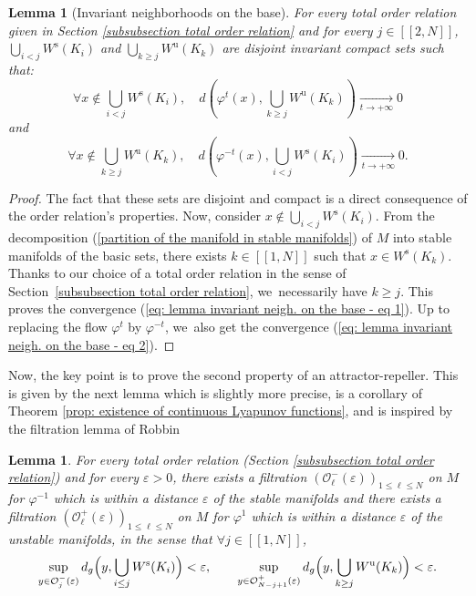 \documentclass[11pt]{article}
\newcommand{\lcr}{[\![}
\newcommand{\rcr}{]\!]}
\newcommand{\rs}{\mathrm{s}}
\newcommand{\ru}{\mathrm{u}}
\theoremstyle{definition}
\theoremstyle{plain}
\newtheorem{lemma}[definition]{Lemma}
\newcommand{\Ocal}{\mathcal{O}}
\begin{document}
\begin{lemma}[Invariant neighborhoods on the base]\label{lemma: attractor and repeller for the flow on the basis}
For every total order relation given in Section \ref{subsubsection total order relation} and for every $j\in\lcr2,N\rcr$, $\bigcup_{i < j}W^\rs (K_i)$ and $\bigcup_{k \geq j}W^\ru (K_k)$ are disjoint invariant compact sets such that:
\begin{equation}\label{eq: lemma invariant neigh. on the base - eq 1}
\forall x \notin \bigcup_{i < j}W^\rs (K_i), \quad d (\varphi^t (x), \bigcup_{k \geq j}W^\ru (K_k)) \underset{t \to+\infty}{\to} 0
\end{equation}
and
\begin{equation}\label{eq: lemma invariant neigh. on the base - eq 2}
\forall x \notin \bigcup_{k \geq j}W^\ru (K_k), \quad d (\varphi^{-t} (x),\bigcup_{i < j}W^\rs (K_i)) \underset{t \to+\infty}{\to} 0.
\end{equation}
\end{lemma}

\begin{proof}
The fact that these sets are disjoint and compact is a direct consequence of the order relation's properties. Now, consider $x \notin \bigcup_{i < j}W^\rs (K_i)$. From the decomposition (\ref{partition of the manifold in stable manifolds}) of $M$ into stable manifolds of the basic sets, there exists $k\in\lcr1,N\rcr$ such that $x \in W^\rs(K_k)$. Thanks to our choice of a total order relation in the sense of Section~\ref{subsubsection total order relation}, we~necessarily have $k \geq j$. This proves the convergence (\ref{eq: lemma invariant neigh. on the base - eq 1}). Up to replacing the flow $\varphi^t$ by $\varphi^{-t}$, we~also get the convergence (\ref{eq: lemma invariant neigh. on the base - eq 2}).
\end{proof}

Now, the key point is to prove the second property of an attractor-repeller. This is given by the next lemma which is slightly more precise, is a corollary of Theorem \ref{prop: existence of continuous Lyapunov functions}, and is inspired by the filtration lemma of Robbin \cite[7.9]{robbin}

\begin{lemma}\label{lemma: equivalence filtration and unrevisited}
For every total order relation (Section \ref{subsubsection total order relation}) and for every $\varepsilon >0$, there exists a filtration $(\Ocal_{\ell}^- (\varepsilon))_{1\leq \ell \leq N}$ on $M$ for $\varphi^{-1}$ which is within a distance $\varepsilon$ of the stable manifolds and there exists a filtration $(\Ocal_{\ell}^+ (\varepsilon))_{1\leq \ell \leq N}$ on $M$ for $\varphi^{1}$ which is within a distance $\varepsilon$ of the unstable manifolds, in the sense that $\forall j \in \lcr1,N\rcr$,
\[
\sup_{y \in \Ocal_j^- (\varepsilon)} d_g \Bigl(y, \bigcup_{i \leq j} W^\rs (K_i) \Bigr) < \varepsilon, \qquad \sup_{y \in \Ocal_{N-j+1}^+ (\varepsilon)} d_g \Bigl(y, \bigcup_{k \geq j} W^\ru (K_k)\Bigr) < \varepsilon.
\]
\end{lemma}
\end{document}
